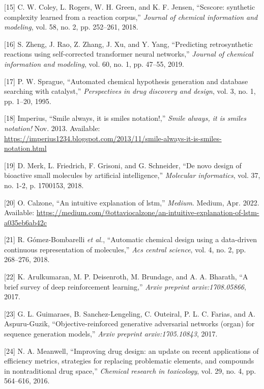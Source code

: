 \documentclass[11pt]{article}
\begin{document}
\hypertarget{citeproc_bib_item_15}{[15] C. W. Coley, L. Rogers, W. H. Green, and K. F. Jensen, “Scscore: synthetic complexity learned from a reaction corpus,” \textit{Journal of chemical information and modeling}, vol. 58, no. 2, pp. 252–261, 2018.}

\hypertarget{citeproc_bib_item_16}{[16] S. Zheng, J. Rao, Z. Zhang, J. Xu, and Y. Yang, “Predicting retrosynthetic reactions using self-corrected transformer neural networks,” \textit{Journal of chemical information and modeling}, vol. 60, no. 1, pp. 47–55, 2019.}

\hypertarget{citeproc_bib_item_17}{[17] P. W. Sprague, “Automated chemical hypothesis generation and database searching with catalyst,” \textit{Perspectives in drug discovery and design}, vol. 3, no. 1, pp. 1–20, 1995.}

\hypertarget{citeproc_bib_item_18}{[18] Imperius, “Smile always, it is smiles notation!,” \textit{Smile always, it is smiles notation!} Nov. 2013. Available: \url{https://imperius1234.blogspot.com/2013/11/smile-always-it-is-smiles-notation.html}}

\hypertarget{citeproc_bib_item_19}{[19] D. Merk, L. Friedrich, F. Grisoni, and G. Schneider, “De novo design of bioactive small molecules by artificial intelligence,” \textit{Molecular informatics}, vol. 37, no. 1-2, p. 1700153, 2018.}

\hypertarget{citeproc_bib_item_20}{[20] O. Calzone, “An intuitive explanation of lstm,” \textit{Medium}. Medium, Apr. 2022. Available: \url{https://medium.com/@ottaviocalzone/an-intuitive-explanation-of-lstm-a035eb6ab42c}}

\hypertarget{citeproc_bib_item_21}{[21] R. Gómez-Bombarelli \textit{et al.}, “Automatic chemical design using a data-driven continuous representation of molecules,” \textit{Acs central science}, vol. 4, no. 2, pp. 268–276, 2018.}

\hypertarget{citeproc_bib_item_22}{[22] K. Arulkumaran, M. P. Deisenroth, M. Brundage, and A. A. Bharath, “A brief survey of deep reinforcement learning,” \textit{Arxiv preprint arxiv:1708.05866}, 2017.}

\hypertarget{citeproc_bib_item_23}{[23] G. L. Guimaraes, B. Sanchez-Lengeling, C. Outeiral, P. L. C. Farias, and A. Aspuru-Guzik, “Objective-reinforced generative adversarial networks (organ) for sequence generation models,” \textit{Arxiv preprint arxiv:1705.10843}, 2017.}

\hypertarget{citeproc_bib_item_24}{[24] N. A. Meanwell, “Improving drug design: an update on recent applications of efficiency metrics, strategies for replacing problematic elements, and compounds in nontraditional drug space,” \textit{Chemical research in toxicology}, vol. 29, no. 4, pp. 564–616, 2016.}
\end{document}

